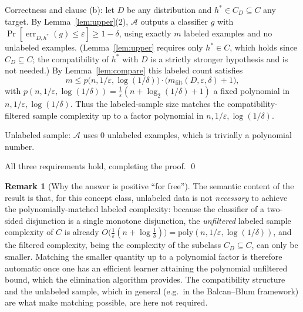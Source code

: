 \documentclass{amsart}
\theoremstyle{definition}
\newtheorem{remark}{Remark}
\DeclareMathOperator{\err}{err}
\newcommand{\eps}{\varepsilon}
\begin{document}
Correctness and clause (b): let $D$ be any distribution and
$h^\ast\in C_D\subseteq C$ any target. By Lemma~\ref{lem:upper}(2),
$\mathcal A$ outputs a classifier $g$ with
$\Pr[\err_{D,h^\ast}(g)\le\eps]\ge1-\delta$, using exactly $m$ labeled examples
and no unlabeled examples. (Lemma~\ref{lem:upper} requires only $h^\ast\in C$,
which holds since $C_D\subseteq C$; the compatibility of $h^\ast$ with $D$ is a
strictly stronger hypothesis and is not needed.) By Lemma~\ref{lem:compare}
this labeled count satisfies
\[
  m \le p\bigl(n,1/\eps,\log(1/\delta)\bigr)\cdot
        \bigl(m_{\mathrm{filt}}(D,\eps,\delta)+1\bigr),
\]
with $p(n,1/\eps,\log(1/\delta))=\frac1\eps(n+\log_2(1/\delta)+1)$ a fixed
polynomial in $n,1/\eps,\log(1/\delta)$. Thus the labeled-sample size matches
the compatibility-filtered sample complexity up to a factor polynomial in
$n,1/\eps,\log(1/\delta)$.

Unlabeled sample: $\mathcal A$ uses $0$ unlabeled examples, which is trivially a
polynomial number.

All three requirements hold, completing the proof. \qed

\begin{remark}[Why the answer is positive ``for free'']
The semantic content of the result is that, for this concept class, unlabeled
data is not \emph{necessary} to achieve the polynomially-matched labeled
complexity: because the classifier of a two-sided disjunction is a single
monotone disjunction, the \emph{unfiltered} labeled sample complexity of $C$ is
already $O\bigl(\frac1\eps(n+\log\frac1\delta)\bigr)=
\mathrm{poly}(n,1/\eps,\log(1/\delta))$, and the filtered complexity, being the
complexity of the subclass $C_D\subseteq C$, can only be smaller. Matching the
smaller quantity up to a polynomial factor is therefore automatic once one has
an efficient learner attaining the polynomial unfiltered bound, which the
elimination algorithm provides. The compatibility structure and the unlabeled
sample, which in general (e.g.\ in the Balcan--Blum framework) are what make
matching possible, are here not required.
\end{remark}
\end{document}
